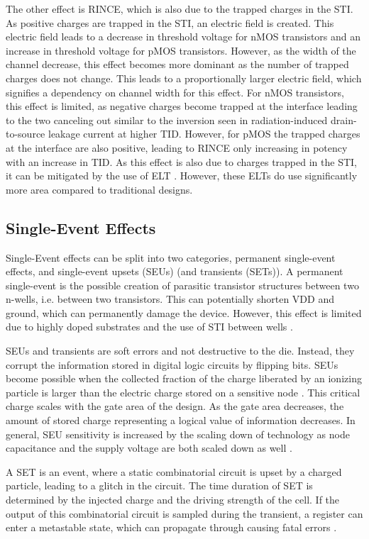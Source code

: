 The other effect is RINCE, which is also due to the trapped charges in the STI. As positive charges are trapped in the STI, an electric field is created. This electric field leads to a decrease in threshold voltage for nMOS transistors and an increase in threshold voltage for pMOS transistors. However, as the width of the channel decrease, this effect becomes more dominant as the number of trapped charges does not change. This leads to a proportionally larger electric field, which signifies a dependency on channel width for this effect. For nMOS transistors, this effect is limited, as negative charges become trapped at the interface leading to the two canceling out similar to the inversion seen in radiation-induced drain-to-source leakage current at higher TID. However, for pMOS the trapped charges at the interface are also positive, leading to RINCE only increasing in potency with an increase in TID. As this effect is also due to charges trapped in the STI, it can be mitigated by the use of ELT \cite{giulioThesis}. However, these ELTs do use significantly more area compared to traditional designs. 

\subsection{Single-Event Effects}
Single-Event effects can be split into two categories, permanent single-event effects, and single-event upsets (SEUs) (and transients (SETs)). A permanent single-event is the possible creation of parasitic transistor structures between two n-wells, i.e. between two transistors. This can potentially shorten VDD and ground, which can permanently damage the device. However, this effect is limited due to highly doped substrates and the use of STI between wells \cite{aleThesis}. 

SEUs and transients are soft errors and not destructive to the die. Instead, they corrupt the information stored in digital logic circuits by flipping bits. SEUs become possible when the collected fraction of the charge liberated by an ionizing particle is larger than the electric charge stored on a sensitive node \cite{aleThesis}. This critical charge scales with the gate area of the design. As the gate area decreases, the amount of stored charge representing a logical value of information decreases. In general, SEU sensitivity is increased by the scaling down of technology as node capacitance and the supply voltage are both scaled down as well \cite{aleThesis}. 

A SET is an event, where a static combinatorial circuit is upset by a charged particle, leading to a glitch in the circuit. The time duration of SET is determined by the injected charge and the driving strength of the cell. If the output of this combinatorial circuit is sampled during the transient, a register can enter a metastable state, which can propagate through causing fatal errors \cite{aleThesis}. 
%
%
